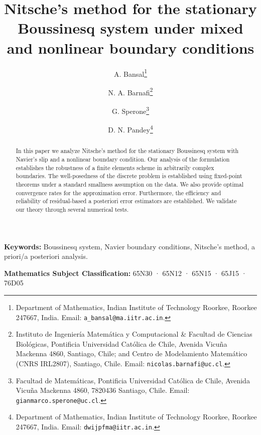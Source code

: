 \documentclass[10pt,a4paper]{article}
\begin{document}
\title{\bf Nitsche's method for the stationary Boussinesq system under mixed and nonlinear boundary conditions}

\author{
  A. Bansal\thanks{Department of Mathematics, Indian Institute of Technology Roorkee, Roorkee 247667, India. Email: \texttt{a\_bansal@ma.iitr.ac.in}.}
  \and N. A. Barnafi\thanks{Instituto de Ingeniería Matemática y Computacional \& Facultad de Ciencias Biológicas, Pontificia Universidad Católica de Chile, Avenida Vicuña Mackenna 4860, Santiago, Chile; and Centro de Modelamiento Matemático (CNRS IRL2807), Santiago, Chile. Email: \texttt{nicolas.barnafi@uc.cl}.}
  \and G. Sperone\thanks{Facultad de Matemáticas, Pontificia Universidad Católica de Chile, Avenida Vicuña Mackenna 4860, 7820436 Santiago, Chile. Email: \texttt{gianmarco.sperone@uc.cl}.}
  \and D. N. Pandey\thanks{Department of Mathematics, Indian Institute of Technology Roorkee, Roorkee 247667, India. Email: \texttt{dwijpfma@iitr.ac.in}.}
}
\date{}
\maketitle

\begin{abstract}
In this paper we analyze Nitsche’s method for the stationary Boussinesq system with Navier's slip and a nonlinear boundary condition. Our analysis of the formulation establishes the robustness of a finite elements scheme in arbitrarily complex boundaries. The well-posedness of the discrete problem is established using fixed-point theorems under a standard smallness assumption on the data. We also provide optimal convergence rates for the approximation error. Furthermore, the efficiency and reliability of residual-based a posteriori error estimators are established.  We validate our theory through several numerical tests.
\end{abstract}

\vspace{0.5cm}

 \noindent\textbf{Keywords:} Boussinesq system, Navier boundary conditions, Nitsche's method, a priori/a posteriori analysis.

 \vspace{0.5cm}

\noindent\textbf{Mathematics Subject Classification:} 65N30 · 65N12 · 65N15 · 65J15 · 76D05
\end{document}
